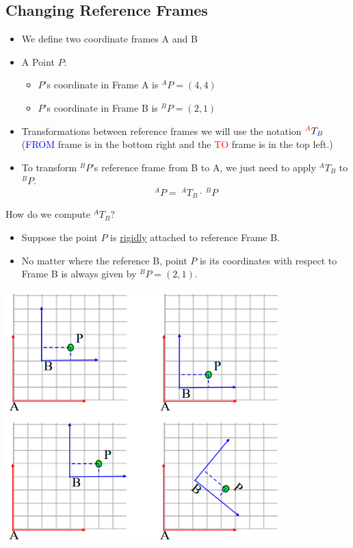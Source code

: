 \documentclass[10pt]{article}
\begin{document}
\subsection*{Changing Reference Frames}
\begin{itemize}
	\item We define two coordinate frames A and B
	\item A Point $P$:
	\begin{itemize}
        \item $P$'s coordinate in Frame A is $^A P = (4, 4)$
        \item $P$'s coordinate in Frame B is $^B P = (2, 1)$
    \end{itemize}
    \item Transformations between reference frames we will use the notation $^{\textcolor{red}{A}} T_{\textcolor{blue}{B}}$ (\textcolor{blue}{FROM} frame is in the bottom right and the \textcolor{red}{TO} frame is in the top left.)
    \item To transform $^B P$'s reference frame from B to A, we just need to apply $^A T_B$ to $^B P$.
    \[^A P = \:^A T_B \cdot \:^B P\]
\end{itemize}
How do we compute $^A T_B$?
\begin{itemize}
	\item Suppose the point $P$ is \underline{rigidly} attached to reference Frame B.
	\item No matter where the reference B, point $P$ is its coordinates with respect to Frame B is always given by $^B P = (2, 1)$.
\end{itemize}
\begin{center} 
	\includegraphics*[width=0.8\textwidth]{L1_10.png} 
\end{center}
\end{document}
